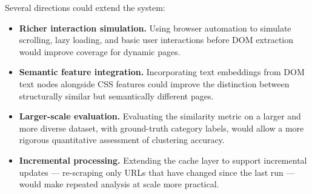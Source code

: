 Several directions could extend the system:

\begin{itemize}
    \item \textbf{Richer interaction simulation.} Using browser automation to simulate scrolling, lazy loading, and basic user interactions before DOM extraction would improve coverage for dynamic pages.

    \item \textbf{Semantic feature integration.} Incorporating text embeddings from DOM text nodes alongside CSS features could improve the distinction between structurally similar but semantically different pages.

    \item \textbf{Larger-scale evaluation.} Evaluating the similarity metric on a larger and more diverse dataset, with ground-truth category labels, would allow a more rigorous quantitative assessment of clustering accuracy.

    \item \textbf{Incremental processing.} Extending the cache layer to support incremental updates --- re-scraping only URLs that have changed since the last run --- would make repeated analysis at scale more practical.
\end{itemize}
